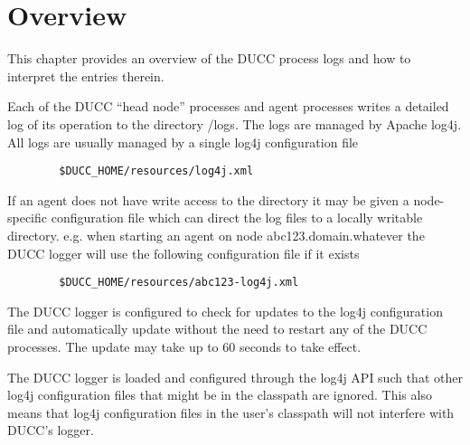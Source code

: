 % 
% 
% 
% 
 \section{Overview}

    This chapter provides an overview of the DUCC process logs and how to interpret the
    entries therein.

    Each of the DUCC ``head node'' processes and agent processes writes a detailed log of its operation to
    the directory \ducchome/logs.  The logs are managed by Apache log4j.  All logs are
    usually managed by a single log4j configuration file
\begin{verbatim}
        $DUCC_HOME/resources/log4j.xml
\end{verbatim}
    If an agent does not have write access to the \ducchome directory it may be given a
    node-specific configuration file which can direct the log files to a locally writable
    directory.  e.g. when starting an agent on node abc123.domain.whatever the DUCC logger will use
    the following configuration file if it exists
\begin{verbatim}
        $DUCC_HOME/resources/abc123-log4j.xml
\end{verbatim}

    The DUCC logger is configured to check for updates to the log4j
    configuration file and automatically update without the need to restart any of
    the DUCC processes.  The update may take up to 60 seconds to take effect.

    The DUCC logger is loaded and configured through the log4j API such that other
    log4j configuration files that might be in the classpath are ignored.  This also
    means that log4j configuration files in the user's classpath will not interfere
    with DUCC's logger.

